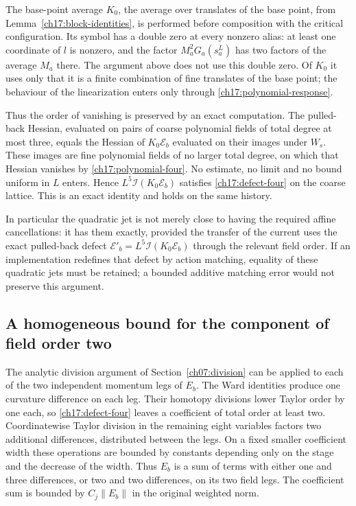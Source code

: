 The base-point average $K_0$, the average over translates of the base point, from
Lemma~\ref{ch17:block-identities}, is performed before composition with the critical
configuration. Its symbol has a double zero at every nonzero
alias: at least one coordinate of $l$ is nonzero, and the factor
$M_a^2G_a(s_a^L)$ has two factors of the average $M_a$ there.
The argument above does not use this double zero. Of $K_0$ it uses only
that it is a finite combination of fine translates of the base point; the
behaviour of the linearization enters only through \eqref{ch17:polynomial-response}.

Thus the order of vanishing is preserved by an exact computation. The
pulled-back Hessian, evaluated on pairs of coarse polynomial fields of total degree
at most three, equals the Hessian of $K_0\mathcal E_b$ evaluated on their images
under $W_s$. These images are fine polynomial fields of no larger total degree,
on which that Hessian vanishes by \eqref{ch17:polynomial-four}. No estimate,
no limit and no bound uniform in $L$ enters. Hence $L^5\mathcal I(K_0\mathcal E_b)$
satisfies \eqref{ch17:defect-four} on the coarse lattice. This is an
exact identity and holds on the same history.

In particular the quadratic jet is not merely close to having the
required affine cancellations: it has them exactly, provided the
transfer of the current uses the exact pulled-back defect
$\mathcal E'_b=L^5\mathcal I(K_0\mathcal E_b)$ through the relevant
field order. If an implementation redefines that defect by action
matching, equality of these quadratic jets must be retained; a bounded
additive matching error would not preserve this argument.

\subsection{A homogeneous bound for the component of field order two}

The analytic division argument of Section~\ref{ch07:division} can be
applied to each of the two independent momentum legs of $E_b$.
The Ward identities produce one curvature difference on each leg.
Their homotopy divisions lower Taylor order by one each, so
\eqref{ch17:defect-four} leaves a coefficient of total order at least
two. Coordinatewise Taylor division in the remaining eight variables
factors two additional differences, distributed between the legs.
On a fixed smaller coefficient width these operations are bounded by
constants depending only on the stage and the decrease of the width. Thus $E_b$
is a sum of terms with either one and three differences, or two and
two differences, on its two field legs. The coefficient sum is bounded
by $C_j\|E_b\|$ in the original weighted norm.

